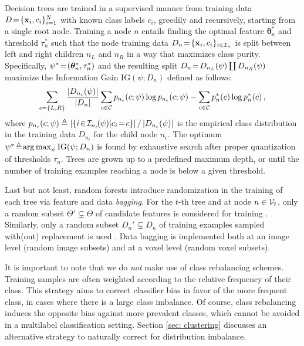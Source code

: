Decision trees are trained in a supervised manner from training data $D\!=\!\{\boldsymbol{\mathrm{x}}_i,c_i\}_{i=1}^N$ with known 
class labels $c_i$, greedily and recursively, starting from a single root node. Training a node $n$ entails 
finding the optimal feature $\bm{\theta}_n^\ast$ and threshold $\tau_n^\ast$ such that the node training data 
$D_n\!=\!\{\boldsymbol{\mathrm{x}}_i,c_i\}_{i\in\mathcal{I}_n}$ is split between left and right children $n_L$ and $n_R$ in a way that maximizes 
class purity. Specifically, $\psi^\ast\!=\!(\bm{\theta}_n^\ast, \tau_n^\ast)$ and the resulting split 
$D_n\!=\! D_{n_L}(\psi)\coprod D_{n_R}(\psi)$ maximize the Information Gain $\text{IG}(\psi; D_n)$ 
defined as follows:
\begin{equation}
\sum_{\epsilon=\{L,R\}} \frac{\vert D_{n_\epsilon}(\psi)\vert}{\vert D_n\vert}\sum_{c\in\mathcal{C}}p_{n_\epsilon}(c;\psi)\log{p_{n_\epsilon}(c;\psi)} \\ 
 -\sum_{c\in\mathcal{C}}p_{n}^\ast(c)\log{p_{n}^\ast(c)}\, ,
\label{eq: IG maximization}
\end{equation}
where $p_{n_\epsilon}(c;\psi)\triangleq\left\vert\{i\!\in\!\mathcal{I}_{n_\epsilon}\!(\psi)\vert c_i\!=\! c\}\right\vert/\left\vert D_{n_\epsilon}(\psi)\right\vert$ is the empirical class distribution in the training data $D_{n_\epsilon}$ for the child node $n_\epsilon$. The optimum $\psi^\ast\!\triangleq\! \operatorname*{arg\,max}_{\psi}\text{IG}(\psi; D_n)$ is found by exhaustive search after proper quantization of thresholds $\tau_n$. Trees are grown up to a predefined 
maximum depth, or until the number of training examples reaching a node is below a given threshold.

Last but not least, random forests introduce randomization in the training of each tree via feature and data \textit{bagging}. For the $t$-th tree and at node $n\in\mathcal{V}_t$, only a random subset $\Theta' \!\varsubsetneq\! \Theta$ of candidate features is considered for training \cite{amit1997shape,ho1998random}. %
Similarly, only a random subset $D_n'\!\varsubsetneq\!D_n$ of training examples sampled with(out) replacement is used \cite{breiman1996bagging}. %
Data bagging is implemented both at an image level (random image subsets) and at a voxel level (random voxel subsets). 

It is important to note that we do \textit{not} make use of class rebalancing schemes. Training samples are often 
weighted according to the relative frequency of their class. This strategy aims to correct classifier bias in favor of 
the more frequent class, in cases where there is a large class imbalance. Of course, class rebalancing induces the 
opposite bias against more prevalent classes, which cannot be avoided in a multilabel classification setting. 
Section \ref{sec: clustering} discusses an alternative strategy to naturally correct for distribution imbalance.
